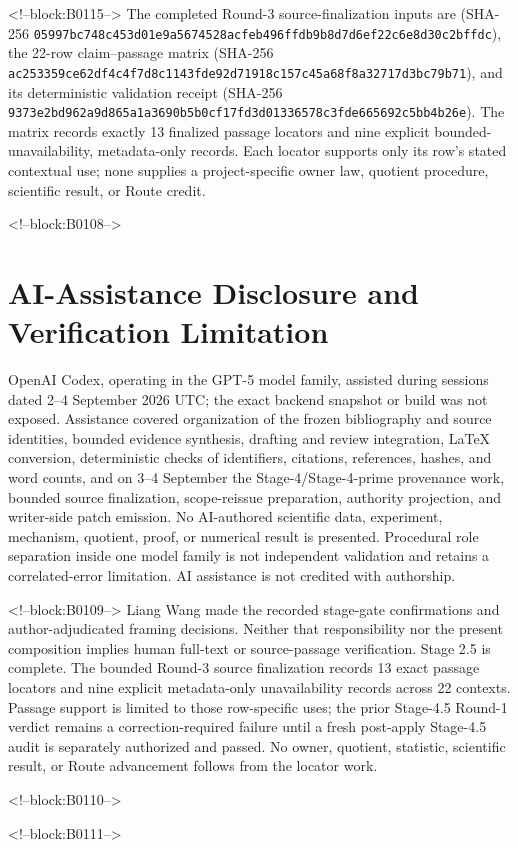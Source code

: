 \documentclass[11pt,a4paper]{article}
\begin{document}
<!--block:B0115-->
The completed Round-3 source-finalization inputs are
 (SHA-256
\texttt{05997bc7\allowbreak{}48c453d0\allowbreak{}1e9a5674\allowbreak{}528acfeb\allowbreak{}496ffdb9\allowbreak{}b8d7d6ef\allowbreak{}22c6e8d3\allowbreak{}0c2bffdc}), the 22-row claim--passage matrix
 (SHA-256
\texttt{ac253359\allowbreak{}ce62df4c\allowbreak{}4f7d8c11\allowbreak{}43fde92d\allowbreak{}71918c15\allowbreak{}7c45a68f\allowbreak{}8a32717d\allowbreak{}3bc79b71}), and its deterministic validation receipt
 (SHA-256
\texttt{9373e2bd\allowbreak{}962a9d86\allowbreak{}5a1a3690\allowbreak{}b5b0cf17\allowbreak{}fd3d0133\allowbreak{}6578c3fd\allowbreak{}e665692c\allowbreak{}5bb4b26e}).  The matrix records exactly 13 finalized
passage locators and nine explicit bounded-unavailability, metadata-only records.
Each locator supports only its row's stated contextual use; none supplies a
project-specific owner law, quotient procedure, scientific result, or Route credit.
\par\endgroup

<!--block:B0108-->
\section*{AI-Assistance Disclosure and Verification Limitation}
OpenAI Codex, operating in the GPT-5 model family, assisted during sessions dated
2--4 September 2026 UTC; the exact backend snapshot or build was not exposed.
Assistance covered organization of the frozen bibliography and source identities,
bounded evidence synthesis, drafting and review integration, LaTeX conversion,
deterministic checks of identifiers, citations, references, hashes, and word counts,
and on 3--4 September the Stage-4/Stage-4-prime provenance work, bounded source
finalization, scope-reissue preparation, authority projection, and writer-side patch
emission. No AI-authored scientific data, experiment, mechanism, quotient, proof, or
numerical result is presented. Procedural role separation inside one model family is
not independent validation and retains a correlated-error limitation. AI assistance
is not credited with authorship.

<!--block:B0109-->
Liang Wang made the recorded stage-gate confirmations and
author-adjudicated framing decisions. Neither that responsibility nor the present
composition implies human full-text or source-passage verification. Stage 2.5 is
complete. The bounded Round-3 source finalization records 13 exact passage locators
and nine explicit metadata-only unavailability records across 22 contexts. Passage
support is limited to those row-specific uses; the prior Stage-4.5 Round-1 verdict
remains a correction-required failure until a fresh post-apply Stage-4.5 audit is
separately authorized and passed. No owner, quotient, statistic, scientific result,
or Route advancement follows from the locator work.

<!--block:B0110-->



<!--block:B0111-->
\end{document}
